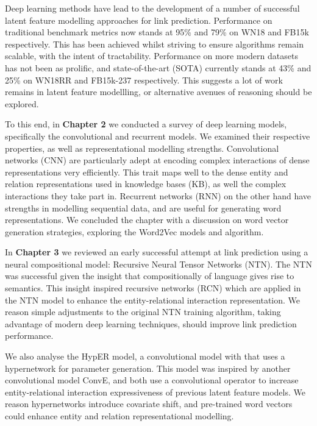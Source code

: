 \noindent Deep learning methods have lead to the development of a number of successful latent feature modelling approaches for link prediction. Performance on traditional benchmark metrics now stands at 95\% and 79\% on WN18 and FB15k respectively. This has been achieved whilst striving to ensure algorithms remain scalable, with the intent of tractability. Performance on more modern datasets has not been as prolific, and state-of-the-art (SOTA) currently stands at 43\% and 25\% on WN18RR and FB15k-237 respectively. This suggests a lot of work remains in latent feature modellling, or alternative avenues of reasoning should be explored. \par

\noindent To this end, in \textbf{Chapter 2} we conducted a survey of deep learning models, specifically the convolutional and recurrent models. We examined their respective properties, as well as representational modelling strengths. Convolutional networks (CNN) are particularly adept at encoding complex interactions of dense representations very efficiently. This trait maps well to the dense entity and relation representations used in knowledge bases (KB), as well the complex interactions they take part in. Recurrent networks (RNN) on the other hand have strengths in modelling sequential data, and are useful for generating word representations. We concluded the chapter with a discussion on word vector generation strategies, exploring the Word2Vec models and algorithm. \par

\noindent In \textbf{Chapter 3} we reviewed an early successful attempt at link prediction using a neural compositional model: Recursive Neural Tensor Networks (NTN). The NTN was successful given the insight that compositionally of language gives rise to semantics. This insight inspired recursive networks (RCN) which are applied in the NTN model to enhance the entity-relational interaction representation. We reason simple adjustments to the original NTN training algorithm, taking advantage of modern deep learning techniques, should improve link prediction performance. \par 

\noindent We also analyse the HypER model, a convolutional model with that uses a hypernetwork for parameter generation. This model was inspired by another convolutional model ConvE, and both use a convolutional operator to increase entity-relational interaction expressiveness of previous latent feature models. We reason hypernetworks introduce covariate shift, and pre-trained word vectors could enhance entity and relation representational modelling. \par

